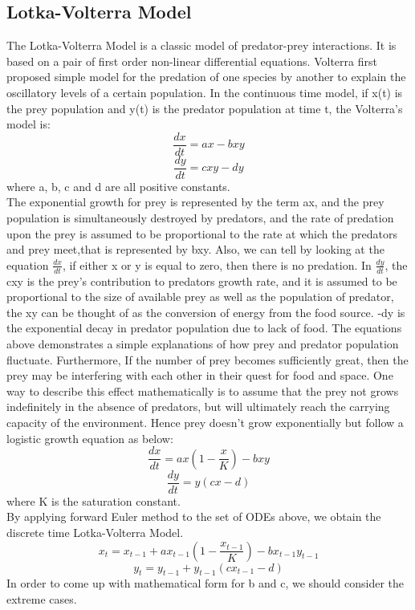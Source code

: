 \documentclass{article}
\begin{document}
\begin{normalsize}
		\subsection{Lotka-Volterra Model}
		The Lotka-Volterra Model is a classic model of predator-prey interactions. It is based on a pair of first order non-linear differential equations. Volterra first proposed simple model for the predation of one species by another to explain the oscillatory levels of a certain population. In the continuous time model, if x(t) is the prey population and y(t) is the predator population at time t, the Volterra's model is:
		$$\frac{dx}{dt} = ax-bxy$$
		$$\frac{dy}{dt} = cxy - dy$$
		where a, b, c and d are all positive constants.\\
		The exponential growth for prey is represented by the term ax, and the prey population is simultaneously destroyed by predators, and the rate of predation upon the prey is assumed to be proportional to the rate at which the predators and prey meet,that is represented by bxy. Also, we can tell by looking at the equation $\frac{dx}{dt}$, if either x or y is equal to zero, then there is no predation. In $\frac{dy}{dt}$, the cxy is the prey's contribution to predators growth rate, and it is assumed to be proportional to the size of available prey as well as the population of predator, the xy can be thought of as the conversion of energy from the food source. -dy is the exponential decay in predator population due to lack of food. The equations above demonstrates a simple explanations of how prey and predator population fluctuate. 
		Furthermore, If the number of prey becomes sufficiently great, then the prey may be interfering with each other in their quest for food and space. One way to describe this effect mathematically is to assume that the prey not grows indefinitely in the absence of predators, but will ultimately reach the carrying capacity of the environment. Hence prey doesn't grow exponentially but follow a logistic growth equation as below:
		$$\frac{dx}{dt} = ax(1-\frac{x}{K})-bxy$$
		$$\frac{dy}{dt} = y(cx-d)$$
		where K is the saturation constant.\\
		By applying forward Euler method to the set of ODEs above, we obtain the discrete time Lotka-Volterra Model.
		$$x_{t} = x_{t-1}+ax_{t-1}(1-\frac{x_{t-1}}{K})-bx_{t-1}y_{t-1}$$
		$$y_{t} = y_{t-1}+y_{t-1}(cx_{t-1} - d)$$		
		In order to come up with mathematical form for b and c, we should consider the extreme cases.

\end{normalsize}
\end{document}
